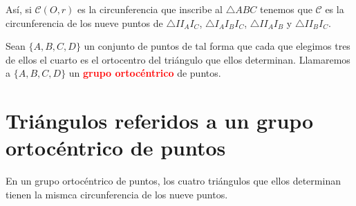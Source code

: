 Así, si $\mathcal{C}(O,r)$ es la circunferencia que inscribe al $\triangle ABC$ tenemos que $\mathcal{C}$ es la circunferencia de los nueve puntos de $\triangle II_{A}I_{C}$, $\triangle I_{A}I_{B}I_{C}$, $\triangle II_{A}I_{B}$ y $\triangle II_{B}I_{C}$.

\begin{df}
Sean $\{A,B,C,D\}$ un conjunto de puntos de tal forma que cada que elegimos tres de ellos el cuarto es el ortocentro del triángulo que ellos determinan. Llamaremos a $\{A,B,C,D\}$ un \textcolor{red}{\bf grupo ortocéntrico} de puntos. 
\end{df}

\section{Triángulos referidos a un grupo ortocéntrico de puntos}
\begin{teo}
En un grupo ortocéntrico de puntos, los cuatro triángulos que ellos determinan tienen la mismca circunferencia de los nueve puntos. 
\end{teo}
